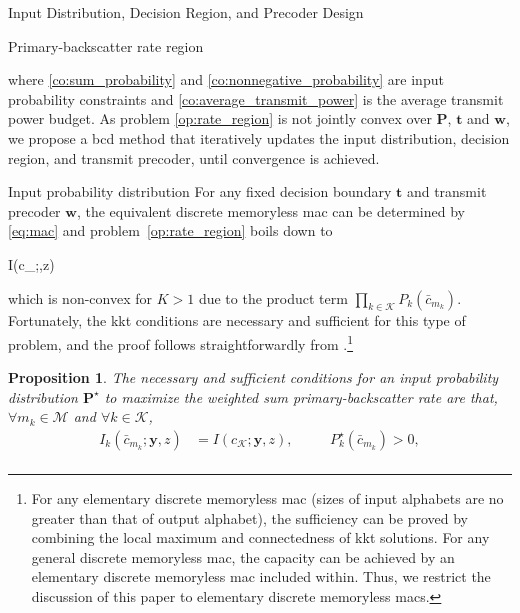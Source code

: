 \documentclass[journal]{IEEEtran}
\newtheorem{proposition}{Proposition}
\begin{document}
\begin{section}{Input Distribution, Decision Region, and Precoder Design}
\begin{subsection}{Primary-backscatter rate region}
\begin{maxi!}
			\end{maxi!}
			where \eqref{co:sum_probability} and \eqref{co:nonnegative_probability} are input probability constraints and \eqref{co:average_transmit_power} is the average transmit power budget. As problem \eqref{op:rate_region} is not jointly convex over $\boldsymbol{P}$, $\boldsymbol{t}$ and $\boldsymbol{w}$, we propose a \gls{bcd} method that iteratively updates the input distribution, decision region, and transmit precoder, until convergence is achieved.
		\end{subsection}

		\begin{subsection}{Input probability distribution}
			For any fixed decision boundary $\boldsymbol{t}$ and transmit precoder $\boldsymbol{w}$, the equivalent discrete memoryless \gls{mac} can be determined by \eqref{eq:mac} and problem~\eqref{op:rate_region} boils down to
			\begin{maxi!}
				{}{I(c_{};,z)}{\label{op:input_probability_distribution}}{}
				\addConstraint{\eqref{co:sum_probability},\eqref{co:nonnegative_probability},}
			\end{maxi!}
			which is non-convex for $K > 1$ due to the product term $\prod_{k \in \mathcal{K}} P_k(\bar{c}_{m_k})$. Fortunately, the \gls{kkt} conditions are necessary and sufficient for this type of problem, and the proof follows straightforwardly from \cite{Watanabe2009}.\footnote{For any elementary discrete memoryless \gls{mac} (sizes of input alphabets are no greater than that of output alphabet), the sufficiency can be proved by combining the local maximum and connectedness of \gls{kkt} solutions. For any general discrete memoryless \gls{mac}, the capacity can be achieved by an elementary discrete memoryless \gls{mac} included within. Thus, we restrict the discussion of this paper to elementary discrete memoryless \gls{mac}s.}
			\begin{proposition}
				The necessary and sufficient conditions for an input probability distribution $\boldsymbol{P}^{\star}$ to maximize the weighted sum primary-backscatter rate are that, $\forall m_k \in \mathcal{M}$ and $\forall k \in \mathcal{K}$,
				\begin{subequations}
					\label{eq:optimal_conditions}
					\begin{alignat}{2}
						I_k(\bar{c}_{m_k};\boldsymbol{y},z) & = I(c_{\mathcal{K}};\boldsymbol{y},z), \quad && P_k^{\star}(\bar{c}_{m_k}) > 0,\label{eq:probable_states}\\

\end{alignat}
\end{subequations}
\end{proposition}
\end{subsection}
\end{section}
\end{document}
